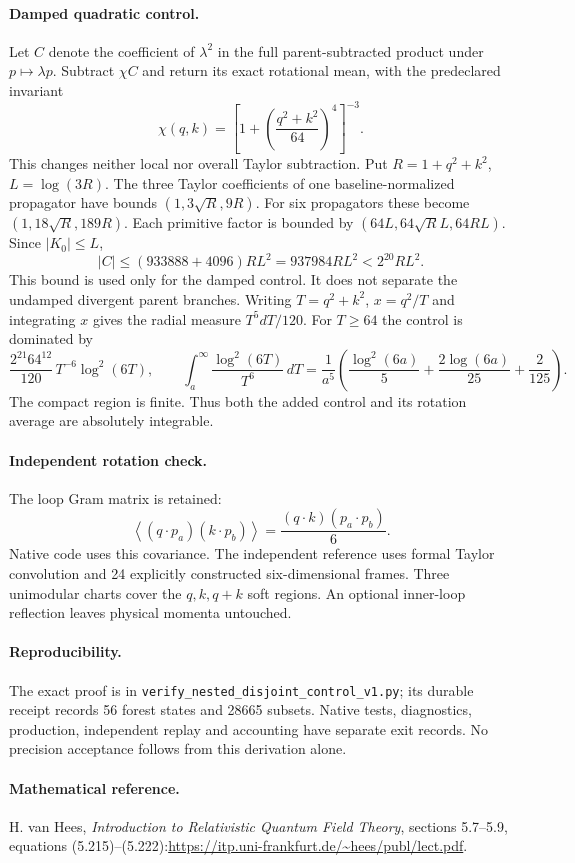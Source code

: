 \documentclass[11pt]{article}
\begin{document}
\paragraph{Damped quadratic control.}
Let $C$ denote the coefficient of $\lambda^2$ in the full parent-subtracted product under $p\mapsto\lambda p$. Subtract $\chi C$ and return its exact rotational mean, with the predeclared invariant
\[
\chi(q,k)=\left[1+\left(\frac{q^2+k^2}{64}\right)^4\right]^{-3}.
\]
This changes neither local nor overall Taylor subtraction. Put $R=1+q^2+k^2$, $L=\log(3R)$. The three Taylor coefficients of one baseline-normalized propagator have bounds $(1,3\sqrt R,9R)$. For six propagators these become $(1,18\sqrt R,189R)$. Each primitive factor is bounded by $(64L,64\sqrt R L,64RL)$. Since $|K_0|\le L$,
\[
|C|\le (933888+4096)RL^2=937984RL^2<2^{20}RL^2.
\]
This bound is used only for the damped control. It does not separate the undamped divergent parent branches.
Writing $T=q^2+k^2$, $x=q^2/T$ and integrating $x$ gives the radial measure $T^5dT/120$. For $T\ge64$ the control is dominated by
\[
\frac{2^{21}64^{12}}{120}\,T^{-6}\log^2(6T),\qquad
\int_a^\infty\frac{\log^2(6T)}{T^6}\,dT
=\frac1{a^5}\left(\frac{\log^2(6a)}5+\frac{2\log(6a)}{25}+\frac2{125}\right).
\]
The compact region is finite. Thus both the added control and its rotation average are absolutely integrable.
\paragraph{Independent rotation check.}
The loop Gram matrix is retained:
\[
\left\langle(q\cdot p_a)(k\cdot p_b)\right\rangle
=\frac{(q\cdot k)(p_a\cdot p_b)}6.
\]
Native code uses this covariance. The independent reference uses formal Taylor convolution and 24 explicitly constructed six-dimensional frames. Three unimodular charts cover the $q,k,q+k$ soft regions. An optional inner-loop reflection leaves physical momenta untouched.
\paragraph{Reproducibility.}
The exact proof is in \texttt{verify\_nested\_disjoint\_control\_v1.py}; its durable receipt records 56 forest states and 28665 subsets. Native tests, diagnostics, production, independent replay and accounting have separate exit records. No precision acceptance follows from this derivation alone.
\paragraph{Mathematical reference.}
H. van Hees, \emph{Introduction to Relativistic Quantum Field Theory}, sections 5.7--5.9, equations (5.215)--(5.222):\newline\url{https://itp.uni-frankfurt.de/~hees/publ/lect.pdf}.
\end{document}
